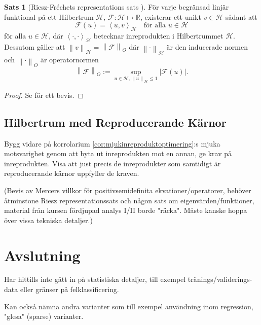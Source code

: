 \documentclass[a4paper, 12pt]{report}
\theoremstyle{definition}
\newtheorem{thm}{Sats}[section]
\theoremstyle{remark}
\begin{document}
\begin{thm}[Riesz-Fréchets representations sats \cite{Young}]
	För varje begränsad linjär funktional på ett Hilbertrum $\mathcal{H}$, $\mathcal{F}: \mathcal{H} \longmapsto \mathbb{R}$, existerar ett unikt $v\in\mathcal{H}$ sådant att
	\begin{equation}
		\mathcal{F}(u)=\left\langle u, v\right\rangle_\mathcal{H}\quad \text{för alla }u\in\mathcal{H}
	\end{equation}
	för alla $u\in\mathcal{H}$, där $\left\langle \cdot, \cdot\right\rangle_\mathcal{H}$ betecknar inreprodukten i Hilbertrummet $\mathcal{H}$.\\
	Dessutom gäller att $\left\| v \right\|_\mathcal{H}=\left\| \mathcal{F}\right\|_O$ där $\left\| \cdot \right\|_\mathcal{H}$ är den inducerade normen och $\left\|\cdot\right\|_O$ är operatornormen \begin{equation*}
	\left\|\mathcal{F}\right\|_O:=\sup_{u\in\mathcal{H},\left\|u\right\|_\mathcal{H}\leq 1}\left|\mathcal{F}(u)\right|.
	\end{equation*}
\end{thm}
\begin{proof}
	Se \cite{Young} för ett bevis.
\end{proof}
\section{Hilbertrum med Reproducerande Kärnor}
Bygg vidare på korrolarium \ref{cor:mjukinreproduktoptimering}:s mjuka motsvarighet genom att byta ut inreprodukten mot en annan, ge krav på inreprodukten. Visa att just precis de inreprodukter som samtidigt är reproducerande kärnor uppfyller de kraven.

(Bevis av Mercers villkor för positivsemidefinita ekvationer/operatorer, behöver åtminstone Riesz representationssats och någon sats om eigenvärden/funktioner, material från kursen fördjupad analys I/II borde "räcka". Måste kanske hoppa över vissa tekniska detaljer.)

\chapter{Avslutning}
Har hittills inte gått in på statistiska detaljer, till exempel tränings/validerings-data eller gränser på felklassificering.

Kan också nämna andra varianter som till exempel användning inom regression, "glesa" (sparse) varianter.



\end{document}
